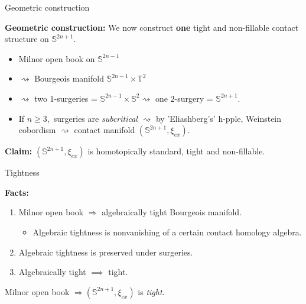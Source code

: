 \documentclass{beamer}
\begin{document}
\begin{frame}{Geometric construction}
    
    \textbf{Geometric construction:} We now construct \textbf{one} tight and non-fillable contact structure on $\mathbb S^{2n+1}$.
    
    \medskip
    
    \pause

    \begin{itemize}
    \item Milnor open book on $\mathbb S^{2n-1}$
    \medskip \pause
    \item $\rightsquigarrow$ Bourgeois manifold $\mathbb S^{2n-1}\times \mathbb T^2$
    \medskip \pause
    \item $\rightsquigarrow $ two $1$-surgeries = $\mathbb S^{2n-1}\times \mathbb S^2 \rightsquigarrow$ one $2$-surgery = $\mathbb S^{2n+1}.$ 
    \medskip \pause   
    \item If $n\geq 3,$ surgeries are \emph{subcritical} $\rightsquigarrow$ by 'Eliashberg's' h-pple, 
    Weinstein cobordism $\rightsquigarrow$ contact manifold $(\mathbb S^{2n+1},\xi_{ex})$.
    \end{itemize}

    \pause
    
    \medskip

    \begin{tcolorbox}
    \textbf{Claim:} $(\mathbb S^{2n+1},\xi_{ex})$ is homotopically standard, tight and non-fillable.
    \end{tcolorbox}
    
\end{frame}

\begin{frame}{Tightness}

    \textbf{Facts:} \begin{enumerate}
        \item Milnor open book $\Rightarrow$  algebraically tight Bourgeois manifold.
        \pause
        \begin{itemize}
            \item Algebraic tightness is nonvanishing of a certain contact homology algebra.
        \end{itemize}
        \pause
        \item Algebraic tightness is preserved under surgeries.
        \pause
        \item Algebraically tight $\implies$ tight.
    \end{enumerate}
    
    \pause
    
    \vspace*{1cm}
    
    \begin{tcolorbox}
        Milnor open book $\Rightarrow (\mathbb S^{2n+1},\xi_{ex})$ is \emph{tight}.
    \end{tcolorbox}
    
\end{frame}
\end{document}
